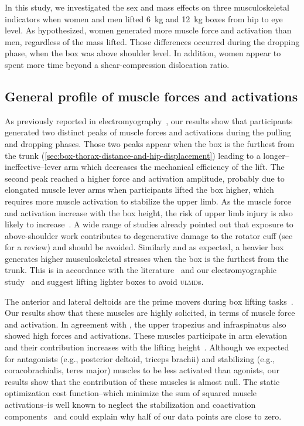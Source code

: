 In this study, we investigated the sex and mass effects on three musculoskeletal indicators when women and men lifted 6~kg and 12~kg boxes from hip to eye level.
As hypothesized, women generated more muscle force and activation than men, regardless of the mass lifted.
Those differences occurred during the dropping phase, when the box was above shoulder level.
In addition, women appear to spent more time beyond a shear-compression dislocation ratio.

\subsection{General profile of muscle forces and activations}\label{subsec:general-profile-of-muscle-forces-and-activations}

As previously reported in electromyography~\cite{Bouffard2019-fd}, our results show that participants generated two distinct peaks of muscle forces and activations during the pulling and dropping phases.
Those two peaks appear when the box is the furthest from the trunk (\ref{sec:box-thorax-distance-and-hip-displacement}) leading to a longer--ineffective--lever arm which decreases the mechanical efficiency of the lift.
The second peak reached a higher force and activation amplitude, probably due to elongated muscle lever arms when participants lifted the box higher, which requires more muscle activation to stabilize the upper limb.
As the muscle force and activation increase with the box height, the risk of upper limb injury is also likely to increase~\cite{Blache2015-oc}.
A wide range of studies already pointed out that exposure to above-shoulder work contributes to degenerative damage to the rotator cuff (see \citet{Van_der_Molen2017-sb} for a review) and should be avoided.
Similarly and as expected, a heavier box generates higher musculoskeletal stresses when the box is the furthest from the trunk.
This is in accordance with the literature~\cite{Blache2015-xe, Yoon2012-ap} and our electromyographic study~\cite{Bouffard2019-fd} and suggest lifting lighter boxes to avoid \textsc{ulmd}s.

The anterior and lateral deltoids are the prime movers during box lifting tasks~\cite{Blache2017-pv,Blache2015-oc,Bouffard2019-fd}.
Our results show that these muscles are highly solicited, in terms of muscle force and activation.
In agreement with \citet{Blache2015-oc}, the upper trapezius and infraspinatus also showed high forces and activations.
These muscles participate in arm elevation~\cite{Ackland2008-vt, Escamilla2009-ho} and their contribution increases with the lifting height~\cite{Blache2015-oc, Herberts1984-xk}.
Although we expected for antagonists (e.g., posterior deltoid, triceps brachii) and stabilizing (e.g., coracobrachialis, teres major) muscles to be less activated than agonists, our results show that the contribution of these muscles is almost null.
The static optimization cost function--which minimize the sum of squared muscle activations--is well known to neglect the stabilization and coactivation components~\cite{Gottlieb2000-ga, Kian2019-gz} and could explain why half of our data points are close to zero.

